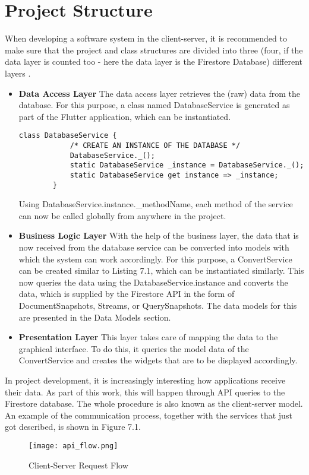 \section{Project Structure}
When developing a software system in the client-server, it is recommended to make sure that the project and class structures are divided into three (four, if the data layer is counted too - here the data layer is the Firestore Database) different layers \cite[p. 175]{.3layer}.
\begin{itemize}
	\item \textbf{Data Access Layer}
	\newline
	The data access layer retrieves the (raw) data from the database. For this purpose, a class named DatabaseService is generated as part of the Flutter application, which can be instantiated.
	\scriptsize
	\begin{lstlisting}[caption=Stepper for Body Part Selection]
		class DatabaseService {
			/* CREATE AN INSTANCE OF THE DATABASE */
			DatabaseService._();
			static DatabaseService _instance = DatabaseService._();
			static DatabaseService get instance => _instance;
		}
	\end{lstlisting}
	\normalsize
	Using DatabaseService.instance.\_methodName, each method of the service can now be called globally from anywhere in the project.
	\item \textbf{Business Logic Layer}
	\newline
	With the help of the business layer, the data that is now received from the database service can be converted into models with which the system can work accordingly. For this purpose, a ConvertService can be created similar to Listing 7.1, which can be instantiated similarly. This now queries the data using the DatabaseService.instance and converts the data, which is supplied by the Firestore API in the form of DocumentSnapshots, Streams, or QuerySnapshots. The data models for this are presented in the Data Models section.
	\item \textbf{Presentation Layer}
	\newline
	This layer takes care of mapping the data to the graphical interface. To do this, it queries the model data of the ConvertService and creates the widgets that are to be displayed accordingly.
\end{itemize}
In project development, it is increasingly interesting how applications receive their data. As part of this work, this will happen through API queries to the Firestore database. The whole procedure is also known as the client-server model. An example of the communication process, together with the services that just got described, is shown in Figure 7.1. 
\begin{figure}[H]
	\centering
	\texttt{[image: api\_flow.png]}
	\caption[Client-Server Request Flow]{Client-Server Request Flow}
\end{figure}
\noindent
